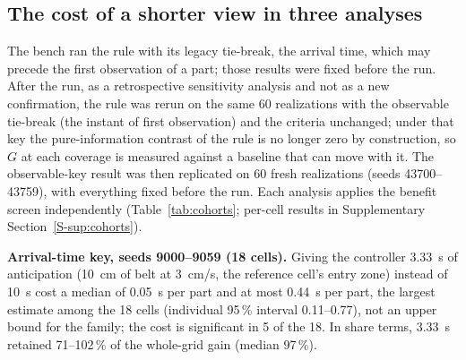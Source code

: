 \documentclass[11pt,a4paper]{article}
\newcommand{\nj}{\textsc{nj}}
\newcommand{\supsec}[1]{Supplementary Section~\ref{S-#1}}
\begin{document}
\subsection{The cost of a shorter view in three analyses}\label{sec:cost}\label{sec:tiebreak}
The bench ran the rule with its legacy tie-break, the arrival time, which may precede the
first observation of a part; those results were fixed before the run. After the run, as a
retrospective sensitivity analysis and not as a new confirmation, the rule was rerun on the
same 60 realizations with the observable tie-break (the instant of first observation) and
the criteria unchanged; under that key the pure-information contrast of the rule is no
longer zero by construction, so $G$ at each coverage is measured against a baseline that
can move with it. The observable-key result was then replicated on 60 fresh realizations
(seeds 43700--43759), with everything fixed before the run. Each analysis applies the
benefit screen independently (Table~\ref{tab:cohorts}; per-cell results in
\supsec{sup:cohorts}).

\begin{table}[t]
\centering\small
\caption{The three analyses of the 3~cm/s geometry bench with \nj: the prespecified run
(arrival-time tie-break), its retrospective rerun with the observable tie-break on the
same realizations, and the replication with the observable tie-break on fresh
realizations. Each analysis applies the benefit screen independently; knees and costs as
in Supplementary Table~\ref{S-tab:sufficient}; the cost interval is the individual paired
95\,\% interval of the cell with the largest estimated cost.}
\label{tab:cohorts}
\end{table}

\textbf{Arrival-time key, seeds 9000--9059 (18 cells).} Giving the controller 3.33~s of
anticipation (10~cm of belt at 3~cm/s, the reference cell's entry zone) instead of 10~s
cost a median of 0.05~s per part and at most 0.44~s per part, the largest estimate among
the 18 cells (individual 95\,\% interval 0.11--0.77), not an upper bound for the family;
the cost is significant in 5 of the 18. In share terms, 3.33~s retained 71--102\,\% of the
whole-grid gain (median 97\,\%).
\end{document}
